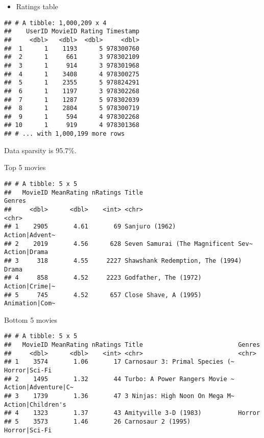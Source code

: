 \documentclass[ignorenonframetext,]{beamer}
\providecommand{\tightlist}{%
  \setlength{\itemsep}{0pt}\setlength{\parskip}{0pt}}
\begin{document}
\begin{frame}[fragile]

\begin{itemize}
\tightlist
\item
  Ratings table
\end{itemize}

\begin{verbatim}
## # A tibble: 1,000,209 x 4
##    UserID MovieID Rating Timestamp
##     <dbl>   <dbl>  <dbl>     <dbl>
##  1      1    1193      5 978300760
##  2      1     661      3 978302109
##  3      1     914      3 978301968
##  4      1    3408      4 978300275
##  5      1    2355      5 978824291
##  6      1    1197      3 978302268
##  7      1    1287      5 978302039
##  8      1    2804      5 978300719
##  9      1     594      4 978302268
## 10      1     919      4 978301368
## # ... with 1,000,199 more rows
\end{verbatim}

Data sparsity is 95.7\%.

\end{frame}

\begin{frame}[fragile]{Top 5 movies}
\protect\hypertarget{top-5-movies}{}

\begin{verbatim}
## # A tibble: 5 x 5
##   MovieID MeanRating nRatings Title                               Genres        
##     <dbl>      <dbl>    <int> <chr>                               <chr>         
## 1    2905       4.61       69 Sanjuro (1962)                      Action|Advent~
## 2    2019       4.56      628 Seven Samurai (The Magnificent Sev~ Action|Drama  
## 3     318       4.55     2227 Shawshank Redemption, The (1994)    Drama         
## 4     858       4.52     2223 Godfather, The (1972)               Action|Crime|~
## 5     745       4.52      657 Close Shave, A (1995)               Animation|Com~
\end{verbatim}

\end{frame}

\begin{frame}[fragile]{Bottom 5 movies}
\protect\hypertarget{bottom-5-movies}{}

\begin{verbatim}
## # A tibble: 5 x 5
##   MovieID MeanRating nRatings Title                          Genres             
##     <dbl>      <dbl>    <int> <chr>                          <chr>              
## 1    3574       1.06       17 Carnosaur 3: Primal Species (~ Horror|Sci-Fi      
## 2    1495       1.32       44 Turbo: A Power Rangers Movie ~ Action|Adventure|C~
## 3    1739       1.36       47 3 Ninjas: High Noon On Mega M~ Action|Children's  
## 4    1323       1.37       43 Amityville 3-D (1983)          Horror             
## 5    3573       1.46       26 Carnosaur 2 (1995)             Horror|Sci-Fi
\end{verbatim}

\end{frame}
\end{document}
